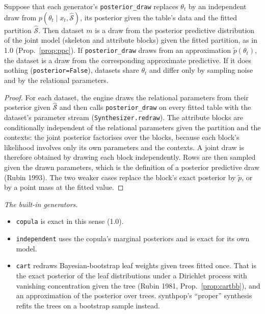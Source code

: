 \begin{proposition}\label{prop:genpost}
Suppose that each generator's \texttt{posterior\_draw} replaces $\theta_t$ by an independent draw from
$p(\theta_t\mid x_t,\hat{\mathcal S})$, its posterior given the table's data and the fitted partition $\hat{\mathcal
S}$. Then dataset $m$ is a draw from the posterior predictive distribution of the joint model (skeleton and
attribute blocks) given the fitted partition, as in 1.0 (Prop.~\ref{prop:ppc}). If
\texttt{posterior\_draw} draws from an approximation $\tilde p(\theta_t)$, the dataset is a draw from the
corresponding approximate predictive. If it does nothing (\texttt{posterior=False}), datasets share $\theta_t$ and
differ only by sampling noise and by the relational parameters.
\end{proposition}
\begin{proof}
For each dataset, the engine draws the relational parameters from their posterior given $\hat{\mathcal S}$ and then
calls \texttt{posterior\_draw} on every fitted table with the dataset's parameter stream
(\texttt{Synthesizer.redraw}). The attribute blocks are conditionally independent of the relational parameters
given the partition and the contexts: the joint posterior factorises over the blocks, because each block's
likelihood involves only its own parameters and the contexts. A joint draw is therefore obtained by drawing each
block independently. Rows are then sampled given the drawn parameters, which is the definition of a posterior
predictive draw (Rubin 1993). The two weaker cases replace the block's exact posterior by $\tilde p$, or by a point
mass at the fitted value.
\end{proof}
\noindent\emph{The built-in generators.}
\begin{itemize}
\item \texttt{copula} is exact in this sense (1.0).
\item \texttt{independent} uses the copula's marginal posteriors and is exact for its own model.
\item \texttt{cart} redraws Bayesian-bootstrap leaf weights given trees fitted once. That is the exact posterior of
the leaf distributions under a Dirichlet process with vanishing concentration given the tree (Rubin 1981, Prop.~\ref{prop:cartbb}),
and an approximation of the posterior over trees. synthpop's ``proper'' synthesis refits the trees on a bootstrap
sample instead.
\end{itemize}

